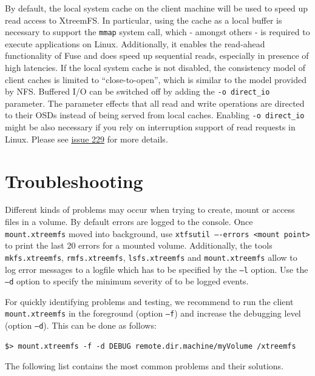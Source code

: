 \documentclass[a4paper,10pt]{book}
\begin{document}
By default, the local system cache on the client machine will be used to speed up read access to XtreemFS. In particular, using the cache as a local buffer is necessary to support the \texttt{mmap} system call, which - amongst others - is required to execute applications on Linux. Additionally, it enables the read-ahead functionality of Fuse and does speed up sequential reads, especially in presence of high latencies. If the local system cache is not disabled, the consistency model of client caches is limited to ``close-to-open'', which is similar to the model provided by NFS. Buffered I/O can be switched off by adding the \texttt{-o direct\_io} parameter. The parameter effects that all read and write operations are directed to their OSDs instead of being served from local caches. Enabling \texttt{-o direct\_io} might be also necessary if you rely on interruption support of read requests in Linux. Please see \href{http://code.google.com/p/xtreemfs/issues/detail?id=229}{issue 229} for more details.


\section{Troubleshooting}

Different kinds of problems may occur when trying to create, mount or access files in a volume. By default errors are logged to the console. Once \texttt{mount.xtreemfs} moved into background, use \texttt{xtfsutil ----errors <mount point>} to print the last 20 errors for a mounted volume. Additionally, the tools \texttt{mkfs.xtreemfs}, \texttt{rmfs.xtreemfs}, \texttt{lsfs.xtreemfs} and \texttt{mount.xtreemfs} allow to log error messages to a logfile which has to be specified by the \texttt{--l} option. Use the \texttt{--d} option to specify the minimum severity of to be logged events.

For quickly identifying problems and testing, we recommend to run the client \texttt{mount.xtreemfs} in the foreground (option \texttt{--f}) and increase the debugging level (option \texttt{--d}). This can be done as follows:

\begin{verbatim}
$> mount.xtreemfs -f -d DEBUG remote.dir.machine/myVolume /xtreemfs
\end{verbatim}

The following list contains the most common problems and their solutions.
\end{document}
